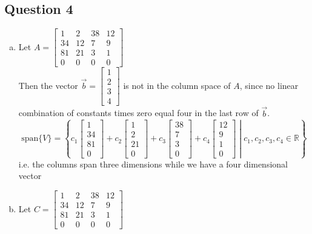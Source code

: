 \documentclass{article}
\begin{document}
\subsection*{Question 4}
\begin{enumerate}[(a)]
    \item 
    Let \(A =
    \begin{bmatrix}
        1& 2& 38& 12 \\
        34& 12& 7& 9 \\
        81& 21& 3& 1 \\
        0&0&0&0
    \end{bmatrix}
    \) \\

    Then the vector \(\vec{b} = \begin{bmatrix}
        1 \\ 2 \\ 3 \\ 4
    \end{bmatrix}\) is not in the column space of \(A\), since no linear combination of 
    constants times zero equal four in the last row of \(\vec{b}\).
    \[
    \text{span}\{{V}\} = \left\{c_1\begin{bmatrix}
        1\\34\\81\\0
        \end{bmatrix} + c_2\begin{bmatrix}
        1\\2\\21\\0
        \end{bmatrix} + c_3\begin{bmatrix}
        38\\7\\3\\0
        \end{bmatrix} + c_4\begin{bmatrix}
        12\\9\\1\\0
        \end{bmatrix} \middle| c_1,c_2,c_3,c_4 \in \mathbb{R}\right\}
    \]
    i.e. the columns span three dimensions while we have a four dimensional vector
    \\

    \item 
    Let \(C =
    \begin{bmatrix}
        1& 2& 38& 12 \\
        34& 12& 7& 9 \\
        81& 21& 3& 1 \\
        0&0&0&0
    \end{bmatrix}
    \) \\
    

\end{enumerate}
\end{document}
